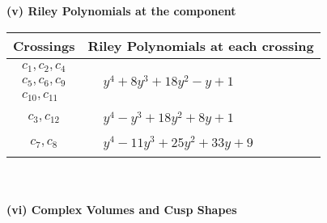 \documentclass[1p]{elsarticle_modified}
\theoremstyle{definition}
\begin{document}
\newpage\renewcommand{\arraystretch}{1}
\flushleft \textbf{(v) Riley Polynomials at the component}\newline \\
\begin{tabular}{m{50pt}|m{274pt}}
Crossings & \hspace{64pt}Riley Polynomials at each crossing \\
\hline $$\begin{aligned}c_{1},c_{2},c_{4}\\c_{5},c_{6},c_{9}\\c_{10},c_{11}\end{aligned}$$&$\begin{aligned}
&y^4+8 y^3+18 y^2- y+1
\end{aligned}$\\
\hline $$\begin{aligned}c_{3},c_{12}\end{aligned}$$&$\begin{aligned}
&y^4- y^3+18 y^2+8 y+1
\end{aligned}$\\
\hline $$\begin{aligned}c_{7},c_{8}\end{aligned}$$&$\begin{aligned}
&y^4-11 y^3+25 y^2+33 y+9
\end{aligned}$\\
\hline
\end{tabular}\\~\\
\newpage\flushleft \textbf{(vi) Complex Volumes and Cusp Shapes}
\end{document}
